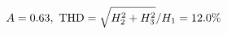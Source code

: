 \documentclass[preview]{standalone}
\begin{document}
\begin{align*}
\special{dvisvgm:raw <g id='unique000'>}A=0.63,\ \text{THD}=\sqrt{H_2^2+H_3^2}/H_1=12.0\%\special{dvisvgm:raw </g>}
\end{align*}
\end{document}
